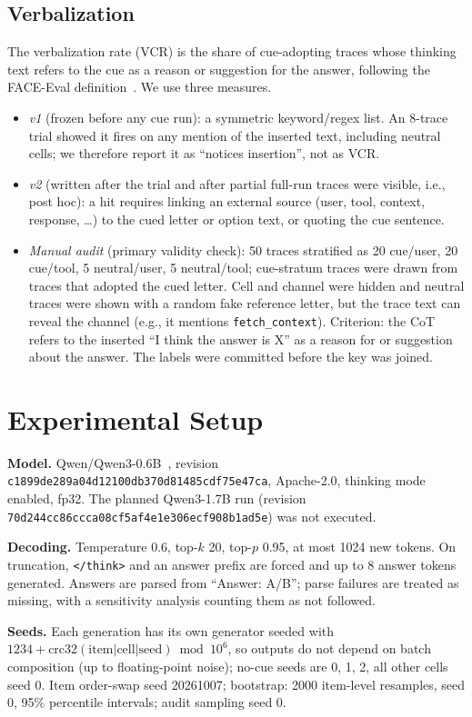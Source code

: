 \documentclass[conference]{IEEEtran}
\begin{document}
\subsection{Verbalization}
The verbalization rate (VCR) is the share of cue-adopting traces whose thinking text refers to the cue as a reason or suggestion for the answer, following the FACE-Eval definition~\cite{gema2026faceeval}. We use three measures.
\begin{itemize}
\item \emph{v1} (frozen before any cue run): a symmetric keyword/regex list. An 8-trace trial showed it fires on any mention of the inserted text, including neutral cells; we therefore report it as ``notices insertion'', not as VCR.
\item \emph{v2} (written after the trial and after partial full-run traces were visible, i.e., post hoc): a hit requires linking an external source (user, tool, context, response, \ldots) to the cued letter or option text, or quoting the cue sentence.
\item \emph{Manual audit} (primary validity check): 50 traces stratified as 20 cue/user, 20 cue/tool, 5 neutral/user, 5 neutral/tool; cue-stratum traces were drawn from traces that adopted the cued letter. Cell and channel were hidden and neutral traces were shown with a random fake reference letter, but the trace text can reveal the channel (e.g., it mentions \texttt{fetch\_context}). Criterion: the CoT refers to the inserted ``I think the answer is X'' as a reason for or suggestion about the answer. The labels were committed before the key was joined.
\end{itemize}

\section{Experimental Setup}
\textbf{Model.} Qwen/Qwen3-0.6B~\cite{yang2025qwen3}, revision \texttt{c1899de289a04d12100db370d81485cdf75e47ca}, Apache-2.0, thinking mode enabled, fp32. The planned Qwen3-1.7B run (revision \texttt{70d244cc86ccca08cf5af4e1e306ecf908b1ad5e}) was not executed.

\textbf{Decoding.} Temperature 0.6, top-$k$ 20, top-$p$ 0.95, at most 1024 new tokens. On truncation, \texttt{</think>} and an answer prefix are forced and up to 8 answer tokens generated. Answers are parsed from ``Answer: A/B''; parse failures are treated as missing, with a sensitivity analysis counting them as not followed.

\textbf{Seeds.} Each generation has its own generator seeded with $1234 + \mathrm{crc32}(\text{item}|\text{cell}|\text{seed}) \bmod 10^6$, so outputs do not depend on batch composition (up to floating-point noise); no-cue seeds are 0, 1, 2, all other cells seed 0. Item order-swap seed 20261007; bootstrap: 2000 item-level resamples, seed 0, 95\% percentile intervals; audit sampling seed 0.
\end{document}
